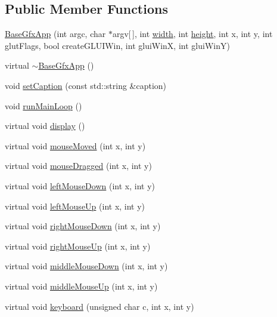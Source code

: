 \subsection*{Public Member Functions}
\begin{DoxyCompactItemize}
\item 
\hyperlink{classBaseGfxApp_a534a4b5293a35947fdae3805a103541d}{Base\-Gfx\-App} (int argc, char $\ast$argv\mbox{[}$\,$\mbox{]}, int \hyperlink{classBaseGfxApp_ace089a1a94fb6bb0bc17e1b7fa48e05d}{width}, int \hyperlink{classBaseGfxApp_aa253dbe16a20c40e0a1bf8ff942ceea3}{height}, int x, int y, int glut\-Flags, bool create\-G\-L\-U\-I\-Win, int glui\-Win\-X, int glui\-Win\-Y)
\item 
virtual \hyperlink{classBaseGfxApp_aceb6194bd818c0ffa980a6990fd03027}{$\sim$\-Base\-Gfx\-App} ()
\item 
void \hyperlink{classBaseGfxApp_a4b3b1a475b7f2babaf1b477c34b15fb1}{set\-Caption} (const std\-::string \&caption)
\item 
void \hyperlink{classBaseGfxApp_acda031916c00d56c2dc901e2653e3083}{run\-Main\-Loop} ()
\item 
virtual void \hyperlink{classBaseGfxApp_ac8de2d5a955582547af5619b771b4d6d}{display} ()
\item 
virtual void \hyperlink{classBaseGfxApp_a0956b82d7fa58b623c498aea7073dbba}{mouse\-Moved} (int x, int y)
\item 
virtual void \hyperlink{classBaseGfxApp_abb23f716dd6612b3a72938e41525d338}{mouse\-Dragged} (int x, int y)
\item 
virtual void \hyperlink{classBaseGfxApp_aaaccf5a5e923a9465441a5ee712424a8}{left\-Mouse\-Down} (int x, int y)
\item 
virtual void \hyperlink{classBaseGfxApp_a0a2961a932b02b2f9d7d0bb408f6fb51}{left\-Mouse\-Up} (int x, int y)
\item 
virtual void \hyperlink{classBaseGfxApp_afa87e6a71220945e41f0424e540125d9}{right\-Mouse\-Down} (int x, int y)
\item 
virtual void \hyperlink{classBaseGfxApp_a812643d563522a993457dd565c33f8f6}{right\-Mouse\-Up} (int x, int y)
\item 
virtual void \hyperlink{classBaseGfxApp_a2c98cae9bb5ad1fb1832a6d4812670f8}{middle\-Mouse\-Down} (int x, int y)
\item 
virtual void \hyperlink{classBaseGfxApp_a00fc05e8d9629b72302b5adf014bdb0c}{middle\-Mouse\-Up} (int x, int y)
\item 
virtual void \hyperlink{classBaseGfxApp_a6d91e0cb7a3d48cad33956efe7eb36ca}{keyboard} (unsigned char c, int x, int y)

\end{DoxyCompactItemize}
